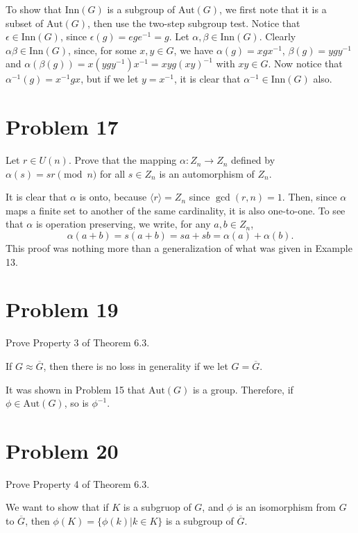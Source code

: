 \documentclass[12pt]{article}
\newcommand{\aut}{\mbox{Aut}}
\newcommand{\inn}{\mbox{Inn}}
\begin{document}
To show that $\inn(G)$ is a subgroup of $\aut(G)$, we first note that
it is a subset of $\aut(G)$, then use the two-step subgroup test.  Notice that $\epsilon\in\inn(G)$,
since $\epsilon(g)=ege^{-1}=g$.
Let $\alpha,\beta\in\inn(G)$.  Clearly $\alpha\beta\in\inn(G)$,
since, for some $x,y\in G$, we have $\alpha(g)=xgx^{-1}$, $\beta(g)=ygy^{-1}$
and $\alpha(\beta(g))=x(ygy^{-1})x^{-1}=xyg(xy)^{-1}$ with $xy\in G$.
Now notice that $\alpha^{-1}(g)=x^{-1}gx$, but if we let $y=x^{-1}$,
it is clear that $\alpha^{-1}\in\inn(G)$ also.

\section*{Problem 17}

Let $r\in U(n)$.  Prove that the mapping $\alpha:Z_n\to Z_n$ defined by
$\alpha(s)=sr\pmod n$ for all $s\in Z_n$ is an automorphism of $Z_n$.

It is clear that $\alpha$ is onto, because $\langle r\rangle=Z_n$ since $\gcd(r,n)=1$.
Then, since $\alpha$ maps a finite set to another of the same cardinality, it is also one-to-one.
To see that $\alpha$ is operation preserving, we write, for any $a,b\in Z_n$,
\begin{equation*}
\alpha(a+b) = s(a+b)=sa+sb=\alpha(a)+\alpha(b).
\end{equation*}
This proof was nothing more than a generalization of what was given
in Example 13.

\section*{Problem 19}

Prove Property 3 of Theorem 6.3.

If $G\approx\overline{G}$, then there is no loss in generality if we let $G=\overline{G}$.

It was shown in Problem 15 that $\aut(G)$ is a group.
Therefore, if $\phi\in\aut(G)$, so is $\phi^{-1}$.

\section*{Problem 20}

Prove Property 4 of Theorem 6.3.

We want to show that if $K$ is a subgruop of $G$, and $\phi$ is an isomorphism
from $G$ to $\overline{G}$, then $\phi(K)=\{\phi(k)|k\in K\}$
is a subgroup of $\overline{G}$.
\end{document}
